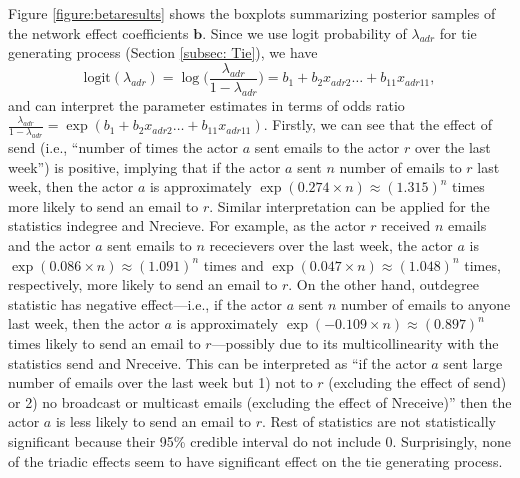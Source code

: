 \documentclass[12pt]{article}
\begin{document}
Figure \ref{figure:betaresults} shows the boxplots summarizing posterior samples of the network effect coefficients $\boldsymbol{b}$. Since we use logit probability of $\lambda_{adr}$ for tie generating process (Section \ref{subsec: Tie}), we have
\begin{equation*}
\mbox{logit}(\lambda_{adr})=\log\Big(\frac{\lambda_{adr}}{1-\lambda_{adr}}\Big) =b_{1}+b_{2} x_{adr2}\ldots+b_{11}x_{adr11},
\end{equation*}
and can interpret the parameter estimates in terms of odds ratio $\frac{\lambda_{adr}}{1-\lambda_{adr}}=\exp(b_{1}+b_{2} x_{adr2}\ldots+b_{11}x_{adr11})$.
Firstly, we can see that the effect of send (i.e., ``number of times the actor $a$ sent emails to the actor $r$ over the last week'') is positive, implying that if the actor $a$ sent $n$ number of emails to $r$ last week, then the actor $a$ is approximately $\exp(0.274\times n)\approx(1.315)^n$ times more likely to send an email to $r$. Similar interpretation can be applied for the statistics indegree and Nrecieve. For example, as the actor $r$ received $n$ emails and the actor $a$ sent emails to $n$ rececievers over the last week, the actor $a$ is $\exp(0.086\times n)\approx(1.091)^n $ times and $\exp(0.047\times n)\approx(1.048)^n$ times, respectively, more likely to send an email to $r$. On the other hand, outdegree statistic has negative effect---i.e., if the actor $a$ sent $n$ number of emails to anyone last week, then the actor $a$ is approximately $\exp(-0.109\times n)\approx(0.897)^n$ times likely to send an email to $r$---possibly due to its multicollinearity with the statistics send and Nreceive. This can be interpreted as ``if the actor $a$ sent large number of emails over the last week but 1) not to $r$ (excluding the effect of send) or 2) no broadcast or multicast emails (excluding the effect of Nreceive)'' then the actor $a$ is less likely to send an email to $r$. Rest of statistics are not statistically significant because their 95\% credible interval do not include 0. Surprisingly, none of the triadic effects seem to have significant effect on the tie generating process.
\end{document}
